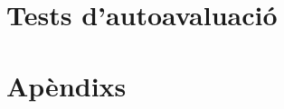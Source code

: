 \documentclass[12pt,a4paper,oneside]{book}
\newif\ifpublicacioparcial
\newif\ifimprimible
\newcommand{\NomTests}{Tests d'autoavaluació}
\newcommand{\NomTests}{Tests interactius}
\begin{document}
\part{\NomTests}
\setcounter{chapter}{0}
\ifimprimible\else\begin{Form}\fi



\ifpublicacioparcial\else






\fi
\ifimprimible\else\end{Form}\fi

\appendix
\part{Apèndixs}




\ifpublicacioparcial\else

\fi

\backmatter



\printindex
\end{document}
